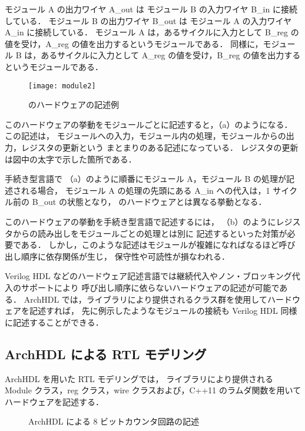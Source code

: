 モジュール A の出力ワイヤ A\_out は モジュール B の入力ワイヤ B\_in に接続している．
モジュール B の出力ワイヤ B\_out は モジュール A の入力ワイヤ A\_in に接続している．
モジュール A は，あるサイクルに入力として B\_reg の値を受け，A\_reg の値を出力するというモジュールである．
同様に，モジュール B は，あるサイクルに入力として A\_reg の値を受け，B\_reg の値を出力するというモジュールである．

\begin{figure}[t]
 \begin{center}
  \texttt{[image: module2]}
  \caption{ のハードウェアの記述例}
  \label{fig:module2}
 \end{center}
\end{figure}

このハードウェアの挙動をモジュールごとに記述すると，（a）のようになる．
この記述は，
モジュールへの入力，モジュール内の処理，モジュールからの出力，レジスタの更新という
まとまりのある記述になっている．
レジスタの更新は図中の太字で示した箇所である．

手続き型言語で
（a）のように順番にモジュール A，モジュール B の処理が記述される場合，
モジュール A の処理の先頭にある A\_in への代入は，1 サイクル前の B\_out の状態となり，
のハードウェアとは異なる挙動となる．

このハードウェアの挙動を手続き型言語で記述するには，
（b）のようにレジスタからの読み出しをモジュールごとの処理とは別に
記述するといった対策が必要である．
しかし，このような記述はモジュールが複雑になればなるほど呼び出し順序に依存関係が生じ，
保守性や可読性が損なわれる．

Verilog HDL などのハードウェア記述言語では継続代入やノン・ブロッキング代入のサポートにより
呼び出し順序に依らないハードウェアの記述が可能である．
ArchHDL では，ライブラリにより提供されるクラス群を使用してハードウェアを記述すれば，
先に例示したようなモジュールの接続も Verilog HDL 同様に記述することができる．

\subsection{ArchHDL による RTL モデリング}
ArchHDL を用いた RTL モデリングでは，
ライブラリにより提供される Module クラス，reg クラス，wire クラスおよび，C++11 のラムダ関数を用いて
ハードウェアを記述する．

\begin{figure}[t]
 
 \caption{ArchHDL による 8 ビットカウンタ回路の記述}
 \label{src:counter}
\end{figure}

